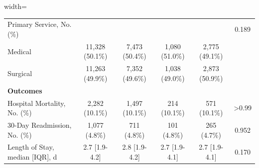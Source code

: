 \documentclass[border=0pt]{standalone}
\begin{document}
\begin{adjustbox}{width=\textwidth}
\begin{tabular}{lccccc}
\hspace{1em}Primary Service, No. (\%) &  &  &  &  & 0.189 \\
\hspace{1em}Medical & 11,328 (50.1\%) & 7,473 (50.4\%) & 1,080 (51.0\%) & 2,775 (49.1\%) &  \\
\hspace{1em}Surgical & 11,263 (49.9\%) & 7,352 (49.6\%) & 1,038 (49.0\%) & 2,873 (50.9\%) &  \\
\textbf{Outcomes} &  &  &  &  &  \\
\hspace{1em}Hospital Mortality, No. (\%) & 2,282 (10.1\%) & 1,497 (10.1\%) & 214 (10.1\%) & 571 (10.1\%) & >0.99 \\
\hspace{1em}30-Day Readmission, No. (\%) & 1,077 (4.8\%) & 711 (4.8\%) & 101 (4.8\%) & 265 (4.7\%) & 0.952 \\
\hspace{1em}Length of Stay, median [IQR], d & 2.7 [1.9-4.2] & 2.8 [1.9-4.2] & 2.7 [1.9-4.1] & 2.7 [1.9-4.1] & 0.170 \\
\bottomrule
\end{tabular}
\end{adjustbox}
\end{document}
